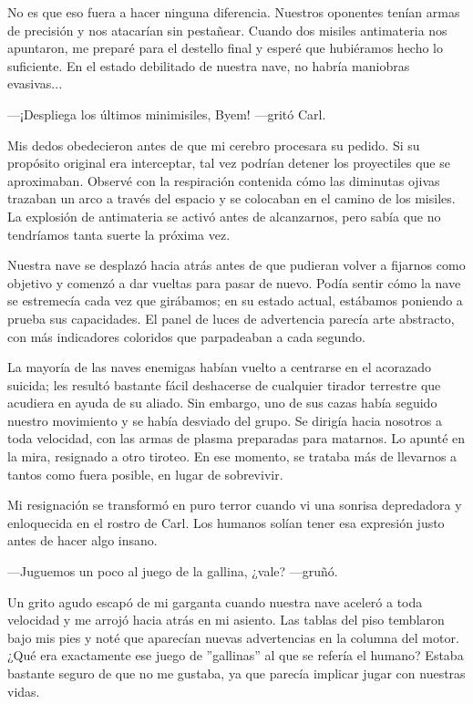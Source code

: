 No es que eso fuera a hacer ninguna diferencia. Nuestros oponentes tenían armas de precisión y nos atacarían sin pestañear. Cuando dos misiles antimateria nos apuntaron, me preparé para el destello final y esperé que hubiéramos hecho lo suficiente. En el estado debilitado de nuestra nave, no habría maniobras evasivas...

—¡Despliega los últimos minimisiles, Byem! —gritó Carl.

Mis dedos obedecieron antes de que mi cerebro procesara su pedido. Si su propósito original era interceptar, tal vez podrían detener los proyectiles que se aproximaban. Observé con la respiración contenida cómo las diminutas ojivas trazaban un arco a través del espacio y se colocaban en el camino de los misiles. La explosión de antimateria se activó antes de alcanzarnos, pero sabía que no tendríamos tanta suerte la próxima vez.

Nuestra nave se desplazó hacia atrás antes de que pudieran volver a fijarnos como objetivo y comenzó a dar vueltas para pasar de nuevo. Podía sentir cómo la nave se estremecía cada vez que girábamos; en su estado actual, estábamos poniendo a prueba sus capacidades. El panel de luces de advertencia parecía arte abstracto, con más indicadores coloridos que parpadeaban a cada segundo.

La mayoría de las naves enemigas habían vuelto a centrarse en el acorazado suicida; les resultó bastante fácil deshacerse de cualquier tirador terrestre que acudiera en ayuda de su aliado. Sin embargo, uno de sus cazas había seguido nuestro movimiento y se había desviado del grupo. Se dirigía hacia nosotros a toda velocidad, con las armas de plasma preparadas para matarnos. Lo apunté en la mira, resignado a otro tiroteo. En ese momento, se trataba más de llevarnos a tantos como fuera posible, en lugar de sobrevivir.

Mi resignación se transformó en puro terror cuando vi una sonrisa depredadora y enloquecida en el rostro de Carl. Los humanos solían tener esa expresión justo antes de hacer algo insano.

—Juguemos un poco al juego de la gallina, ¿vale? —gruñó.

Un grito agudo escapó de mi garganta cuando nuestra nave aceleró a toda velocidad y me arrojó hacia atrás en mi asiento. Las tablas del piso temblaron bajo mis pies y noté que aparecían nuevas advertencias en la columna del motor. ¿Qué era exactamente ese juego de ''gallinas'' al que se refería el humano? Estaba bastante seguro de que no me gustaba, ya que parecía implicar jugar con nuestras vidas.

